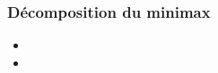 \newcommand{\game}{
  \HStoneGroup[color=white]{
    a3,a5,b1,b4,b5,c1,c2,d4,d5,e1,e2,e5,c3}
  \HStoneGroup[color=black]{
    a2,a4,b2,b3,c4,c5,d1,d2,d3,e3,e4,a1}
}

\begin{frame}
  \frametitle{Décomposition du minimax}
  \begin{itemize}
    \item {}
    \item {}
  \end{itemize}
\end{frame}

\subsubsection{}



\subsubsection{}


